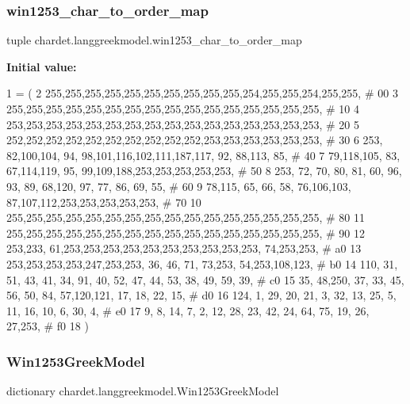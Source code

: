 \subsubsection{\texorpdfstring{win1253\+\_\+char\+\_\+to\+\_\+order\+\_\+map}{win1253\_char\_to\_order\_map}}
{\footnotesize\ttfamily tuple chardet.\+langgreekmodel.\+win1253\+\_\+char\+\_\+to\+\_\+order\+\_\+map}

{\bfseries Initial value\+:}
\begin{DoxyCode}
1 =  (
2 255,255,255,255,255,255,255,255,255,255,254,255,255,254,255,255,  \textcolor{comment}{# 00}
3 255,255,255,255,255,255,255,255,255,255,255,255,255,255,255,255,  \textcolor{comment}{# 10}
4 253,253,253,253,253,253,253,253,253,253,253,253,253,253,253,253,  \textcolor{comment}{# 20}
5 252,252,252,252,252,252,252,252,252,252,253,253,253,253,253,253,  \textcolor{comment}{# 30}
6 253, 82,100,104, 94, 98,101,116,102,111,187,117, 92, 88,113, 85,  \textcolor{comment}{# 40}
7  79,118,105, 83, 67,114,119, 95, 99,109,188,253,253,253,253,253,  \textcolor{comment}{# 50}
8 253, 72, 70, 80, 81, 60, 96, 93, 89, 68,120, 97, 77, 86, 69, 55,  \textcolor{comment}{# 60}
9  78,115, 65, 66, 58, 76,106,103, 87,107,112,253,253,253,253,253,  \textcolor{comment}{# 70}
10 255,255,255,255,255,255,255,255,255,255,255,255,255,255,255,255,  \textcolor{comment}{# 80}
11 255,255,255,255,255,255,255,255,255,255,255,255,255,255,255,255,  \textcolor{comment}{# 90}
12 253,233, 61,253,253,253,253,253,253,253,253,253,253, 74,253,253,  \textcolor{comment}{# a0}
13 253,253,253,253,247,253,253, 36, 46, 71, 73,253, 54,253,108,123,  \textcolor{comment}{# b0}
14 110, 31, 51, 43, 41, 34, 91, 40, 52, 47, 44, 53, 38, 49, 59, 39,  \textcolor{comment}{# c0}
15  35, 48,250, 37, 33, 45, 56, 50, 84, 57,120,121, 17, 18, 22, 15,  \textcolor{comment}{# d0}
16 124,  1, 29, 20, 21,  3, 32, 13, 25,  5, 11, 16, 10,  6, 30,  4,  \textcolor{comment}{# e0}
17   9,  8, 14,  7,  2, 12, 28, 23, 42, 24, 64, 75, 19, 26, 27,253,  \textcolor{comment}{# f0}
18 )
\end{DoxyCode}
\mbox{\label{namespacechardet_1_1langgreekmodel_a3aae4e708215c638147d0f4ddaa8e48a}} 
\subsubsection{\texorpdfstring{Win1253\+Greek\+Model}{Win1253GreekModel}}
{\footnotesize\ttfamily dictionary chardet.\+langgreekmodel.\+Win1253\+Greek\+Model}


